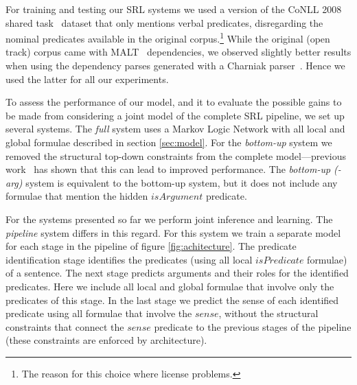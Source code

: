 
For training and testing our SRL systems we used a version of the CoNLL 2008 shared task~\citep{surdeanu08conll} dataset that only mentions verbal predicates, disregarding the nominal predicates available in the original corpus.\footnote{The reason for this choice where license problems.} While the original (open track) corpus came with MALT~\citep{nivre2007mli} dependencies, we observed slightly better results when using the dependency parses generated with a Charniak parser~\citep{charniak00amaximum}. Hence we used the latter for all our experiments.


To assess the performance of our model, and it to evaluate the possible gains to be made from considering a joint model of the complete SRL pipeline, we set up several systems. The \emph{full} system uses a Markov Logic Network with all local and global formulae described in section \ref{sec:model}. For the \emph{bottom-up} system we removed the structural top-down constraints from the complete model---previous work~\citet{riedel08collective} has shown that this can lead to improved performance. The \emph{bottom-up (-arg)} system is equivalent to the bottom-up system, but it does not include any formulae that mention the hidden $isArgument$ predicate.

For the systems presented so far we perform joint inference and learning. The \emph{pipeline} system differs in this regard. For this system we train a separate model for each stage in the pipeline of figure \ref{fig:achitecture}. 
The predicate identification stage identifies the predicates (using all local $isPredicate$ formulae) of a sentence. The next stage predicts arguments and their roles for the identified predicates. Here we include all local and global formulae that involve only the predicates of this stage. In the last stage we predict the sense of each identified predicate using all formulae that involve the $sense$, without the structural constraints that connect the $sense$ predicate to the previous stages of the pipeline (these constraints are enforced by architecture).    


